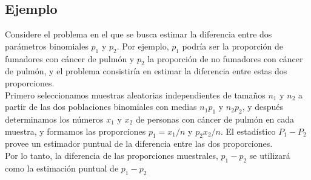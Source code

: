 \documentclass[letterpaper,12pt]{article}
\begin{document}
\begin{sloppypar}
\subsection{Ejemplo}
Considere el problema en el que se busca estimar la diferencia entre dos parámetros binomiales $p_1$ y $p_2$. Por ejemplo, $p_1$ podría ser la proporción de fumadores con cáncer de pulmón y $p_2$ la proporción de no fumadores con cáncer de pulmón, y el problema consistiría en estimar la diferencia entre estas dos proporciones.
\vspace{0.3cm}\\ 
Primero seleccionamos muestras aleatorias independientes de tamaños $n_1$ y $n_2$ a partir de las dos poblaciones binomiales con medias $n_1p_1$ y $n_2p_2$, y después determinamos los números $x_1$ y $x_2$ de personas con cáncer de pulmón en cada muestra, y formamos las proporciones $p_1 = x_1 / n $ y $p_2 x_2 / n$. El estadístico $P_1 - P_2$ provee un estimador puntual de la diferencia entre las dos proporciones.
\vspace{0.3cm}\\
Por lo tanto, la diferencia de las proporciones muestrales, $p_1 - p_2$ se utilizará como la estimación puntual de $p_1 - p_2$


\end{sloppypar}
\end{document}
